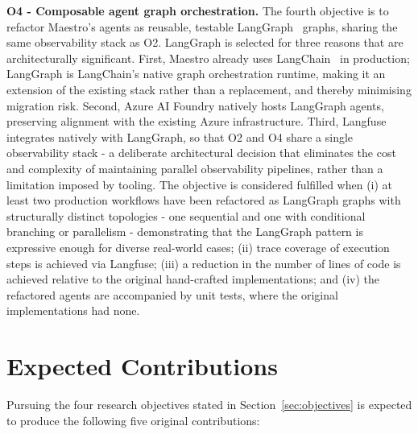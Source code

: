 \textbf{O4 - Composable agent graph orchestration.} The fourth objective is
to refactor Maestro's agents as reusable, testable
LangGraph~\cite{chase2022langchain} graphs, sharing the same observability
stack as O2. LangGraph is selected for three reasons that are architecturally
significant. First, Maestro already uses LangChain~\cite{chase2022langchain}
in production; LangGraph is LangChain's native graph orchestration runtime,
making it an extension of the existing stack rather than a replacement, and
thereby minimising migration risk. Second, Azure AI Foundry natively hosts
LangGraph agents, preserving alignment with the existing Azure infrastructure.
Third, Langfuse integrates natively with LangGraph, so that O2 and O4 share a
single observability stack - a deliberate architectural decision that
eliminates the cost and complexity of maintaining parallel observability
pipelines, rather than a limitation imposed by tooling. The objective is
considered fulfilled when (i) at least two production workflows have been
refactored as LangGraph graphs with structurally distinct topologies - one
sequential and one with conditional branching or parallelism - demonstrating
that the LangGraph pattern is expressive enough for diverse real-world cases;
(ii) trace coverage of execution steps is achieved
via Langfuse; (iii) a reduction in the number of lines of code
is achieved relative to the original hand-crafted implementations; and (iv)
the refactored agents are accompanied by unit tests, where the original
implementations had none.


\section{Expected Contributions}
\label{sec:expected-contribution}

Pursuing the four research objectives stated in
Section~\ref{sec:objectives} is expected to produce the following five
original contributions:


